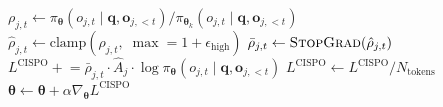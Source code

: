 \documentclass[11pt]{article}
\begin{document}
\begin{algorithm}[p]
\begin{minipage}[t]{0.68\linewidth}
\begin{algorithmic}[1]
                    \State $\rho_{j,t} \gets \pi_{\boldsymbol{\theta}}(o_{j,t} \mid \mathbf{q}, \mathbf{o}_{j,<t}) / \pi_{\boldsymbol{\theta}_k}(o_{j,t} \mid \mathbf{q}, \mathbf{o}_{j,<t})$
                    \State $\hat{\rho}_{j,t} \gets \text{clamp}(\rho_{j,t},\; \max = 1 + \epsilon_{\text{high}})$
                    \State $\bar{\rho}_{j,t} \gets \textsc{StopGrad}(\hat{\rho}_{j,t})$
                    \State $L^{\text{CISPO}} \mathrel{+}= \bar{\rho}_{j,t} \cdot \hat{A}_j \cdot \log \pi_{\boldsymbol{\theta}}(o_{j,t} \mid \mathbf{q}, \mathbf{o}_{j,<t})$
                \EndFor
            \EndFor
            \State $L^{\text{CISPO}} \gets L^{\text{CISPO}} / N_{\text{tokens}}$
            \State $\boldsymbol{\theta} \gets \boldsymbol{\theta} + \alpha \nabla_{\boldsymbol{\theta}} L^{\text{CISPO}}$
        \EndFor
    \EndFor
\EndFor
\end{algorithmic}
\end{minipage}
\end{algorithm}
\end{document}
